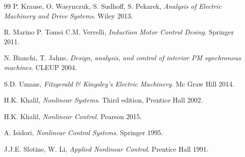 \documentclass[12pt,a4paper]{scrartcl}
\begin{document}
\begin{onehalfspace}
\begin{thebibliography}{99}
	P. Krause, O. Wasynczuk, S. Sudhoff, S. Pekarek, \emph{Analysis of Electric Machinery and Drive Systems}. Wiley 2013.

	R. Marino P. Tomei C.M. Verrelli, \emph{Induction Motor Control Desing}. Springer 2011.
			
	N. Bianchi, T. Jahns, \emph{Design, analysis, and control of interior PM synchronous machines}. CLEUP 2004.

	S.D. Umans, \emph{Fitzgerald \& Kingsley's Electric Machinery}. Mc Graw Hill 2014.
	
	H.K. Khalil, \emph{Nonlinear Systems}. Third edition, Prentice Hall 
	2002.
	
	H.K. Khalil, \emph{Nonlinear Control}. Pearson 2015.
	
	A. Isidori, \emph{Nonlinear Control Systems}. Springer 1995.
	
	J.J.E. Slotine, W. Li, \emph{Applied Nonlinear Control}. Prentice Hall 
	1991.

\end{thebibliography}
\end{onehalfspace}
\end{document}
